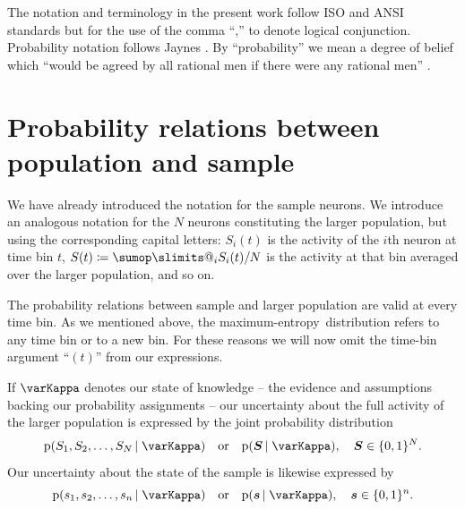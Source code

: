 \documentclass[\ifafour a4paper,12pt,\else a5paper,10pt,\fi%
onecolumn,oneside,article,%
british%
]{memoir}
\makeatletter
\theoremstyle{remark}
\theoremstyle{innote}
\def\sum{\DOTSI\sumop\slimits@}
\newcommand*{\citep}{\parencites}
\newcommand*{\defd}{\coloneqq}
\DeclarePairedDelimiter\set{\{}{\}}
\newcommand*{\pf}{\mathrm{p}}%
\renewcommand*{\|}{\nonscript\,\vert\nonscript\;\mathopen{}}
\newcommand*{\yRv}{S}
\newcommand*{\yrv}{s}
\newcommand*{\yNv}{N}
\newcommand*{\yr}{\bm{\yrv}}%
\newcommand*{\yR}{\bm{\yRv}}%
\newcommand*{\yRf}{\yRv}%
\newcommand*{\yHc}{\varKappa}
\newcommand*{\me}{maximum-entropy}
\makeatother
\begin{document}
The notation and terminology in the present work follow ISO and ANSI standards
\citep{iso1993,ieee1993,nist1995,iso2006,iso2006b} but for the use of the
comma \enquote{,} to denote logical conjunction. Probability notation
follows Jaynes \citep{jaynes1994_r2003}. By \enquote{probability} we mean a
degree of belief which \enquote{would be agreed by all rational men if
  there were any rational men} \citep{good1966}.



\section{Probability relations between population and  sample}
\label{sec:prob_samples}

We have already introduced the notation for the sample neurons. We
introduce an analogous notation for the $\yNv$ neurons constituting the
larger population, but using the corresponding capital letters:
$\yRv_{i}(t)$ is the activity of the $i$th neuron at time bin $t$,
$\yRf(t) \defd \sum_{i} \yRv_{i}(t)/\yNv$ is the activity at that
bin averaged over the larger population, and so on.

The probability relations between sample and larger population are valid at
every time bin. As we mentioned above, the \me\ distribution refers to any
time bin or to a new bin. For these reasons we will now omit the time-bin
argument \enquote{$(t)$} from our expressions. 



If $\yHc$ denotes our state of knowledge -- the evidence and assumptions
backing our probability assignments -- our uncertainty about the full
activity of the larger population is expressed by the joint probability
distribution
\begin{equation}
  \label{eq:joint_plaus}
  \pf(\yRv_1, \yRv_2, \dotsc, \yRv_\yNv \| \yHc)
  \quad\text{or}\quad
\pf(\yR \| \yHc), \quad \yR \in \set{0,1}^\yNv.
\end{equation}
Our uncertainty about the state of the sample is likewise expressed by
\begin{equation}
  \label{eq:sample_plaus}
  \pf(\yrv_1, \yrv_2, \dotsc, \yrv_n \| \yHc) \quad\text{or}\quad
\pf(\yr \| \yHc), \quad \yr \in \set{0,1}^n.
\end{equation}
\end{document}
